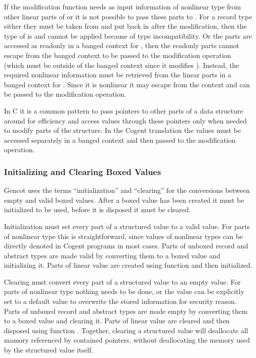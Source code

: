 If the modification function  needs as input information of nonlinear type from other linear parts of  or  it is not
possible to pass these parts to . For a record type  either they must be taken from  and put back in after the modification, then
the type of  is  and  cannot be applied because of type incompatibility. Or the parts are
accessed as readonly in a banged context for , then the readonly parts cannot escape from the banged context to be passed to the
modification operation (which must be outside of the banged context since it modifies ). Instead, the required nonlinear information must 
be retrieved from the linear parts in a banged context for . Since it is nonlinear it may escape from the context and can be passed 
to the modification operation.

In C it is a common pattern to pass pointers to other parts of a data structure around for efficiency and access values through these pointers 
only when needed to modify parts of the structure. In the Cogent translation the values must be accessed separately in a banged context and then
passed to the modification operation.

\subsubsection{Initializing and Clearing Boxed Values}

Gencot uses the terms ``initialization'' and ``clearing'' for the conversions between empty and valid boxed values.
After a boxed value has been created it must be initialized to be used, before it is disposed it must be cleared.

Initialization must set every part of a structured value to a valid value. For parts of nonlinear type this is
straightforward, since values of nonlinear types can be directly denoted in Cogent programs in most cases. Parts
of unboxed record and abstract types are made valid by converting them to a boxed value and initializing it.
Parts of linear value are created using function  and then initialized.

Clearing must convert every part of a structured value to an empty value. For parts of nonlinear type nothing
needs to be done, or the value can be explicitly set to a default value to overwrite the stored information for
security reason. Parts of unboxed record and abstract types are made empty by converting them to a boxed value 
and clearing it. Parts of linear value are cleared and then disposed using function . Together, 
clearing a structured value will deallocate all mamory referenced by contained pointers, without deallocating
the memory used by the structured value itself.

